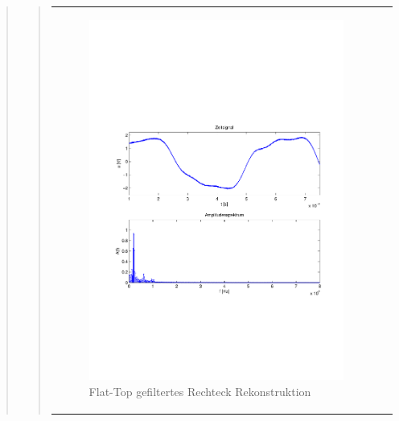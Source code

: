 \begin{quote}
\begin{quote}
\begin{center}
\begin{tabular}{ll}
            \hspace{-4cm}
                \begin{minipage}{0.6\textwidth}
                    \begin{figure}[H]
                        \includegraphics[scale=0.55, trim = 16mm 70mm 16mm 85mm, clip]{Bilder/flatrecFil20_05}
                          \caption{Flat-Top gefiltertes Rechteck Rekonstruktion}
		                  \label{fig:flatrecFil20_05}
                    \end{figure}
                \end{minipage}
                

\end{tabular}
\end{center}
\end{quote}
\end{quote}
